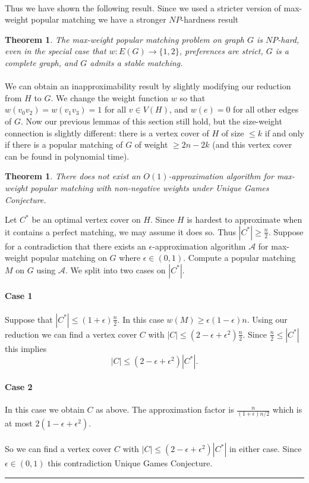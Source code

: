 \documentclass[letterpaper,12pt,oneside,onecolumn]{article}
\newcommand{\cA}{\mathcal{A}} \newcommand{\cB}{\mathcal{B}}
\newenvironment{proof}{{\bf Proof:  }}{\hfill\rule{2mm}{2mm}}
\newtheorem{theorem}[fact]{Theorem}
\begin{document}
\paragraph{}
Thus we have shown the following result. Since we used a stricter version of max-weight popular matching we have a stronger $NP$-hardness result
\begin{theorem}
The max-weight popular matching problem on graph $G$ is $NP$-hard, even in the special case that $w: E(G)\rightarrow \{1,2\}$, preferences are strict, $G$ is a complete graph, and $G$ admits a stable matching.
\end{theorem}
\paragraph{}
We can obtain an inapproximability result by slightly modifying our reduction from $H$ to $G$. We change the weight function $w$ so that $w(v_0v_2) = w(v_1v_3) = 1$ for all $v \in V(H)$, and $w(e) = 0$ for all other edges of $G$. Now our previous lemmas of this section still hold, but the size-weight connection is slightly different: there is a vertex cover of $H$ of size $\leq k$ if and only if there is a popular matching of $G$ of weight $\geq 2n-2k$ (and this vertex cover can be found in polynomial time).
\begin{theorem}
There does not exist an $O(1)$-approximation algorithm for max-weight popular matching with non-negative weights under Unique Games Conjecture.
\end{theorem}
\begin{proof}
Let $C^*$ be an optimal vertex cover on $H$. Since $H$ is hardest to approximate when it contains a perfect matching, we may assume it does so. Thus $|C^*| \geq \frac{n}{2}$. Suppose for a contradiction that there exists an $\epsilon$-approximation algorithm $\cA$ for max-weight popular matching on $G$ where $\epsilon  \in (0,1)$. Compute a popular matching $M$ on $G$ using $\cA$. We split into two cases on $|C^*|$.
\paragraph{Case 1}
Suppose that $|C^*| \leq (1+\epsilon)\frac{n}{2}$. In this case $w(M) \geq \epsilon(1-\epsilon) n$. Using our reduction we can find a vertex cover $C$ with $|C| \leq (2-\epsilon+\epsilon^2)\frac{n}{2}$. Since $\frac{n}{2} \leq |C^*|$ this implies
$$|C| \leq (2-\epsilon +\epsilon^2)|C^*|.$$
\paragraph{Case 2}
In this case we obtain $C$ as above. The approximation factor is $\frac{n}{(1+\epsilon)n/2}$ which is at most $2(1-\epsilon + \epsilon^2)$.
\paragraph{}
So we can find a vertex cover $C$ with $|C| \leq (2-\epsilon + \epsilon^2)|C^*|$ in either case. Since $\epsilon \in (0,1)$ this contradiction Unique Games Conjecture.
\end{proof}
\end{document}
